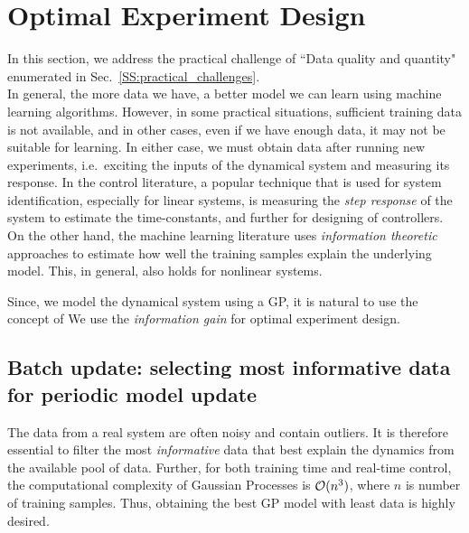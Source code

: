 \section{Optimal Experiment Design}
\label{S:oed}

In this section, we address the practical challenge of ``Data quality and quantity" enumerated in Sec.~\ref{SS:practical_challenges}.
\\

In general, the more data we have, a better model we can learn using machine learning algorithms. However, in some practical situations, sufficient training data is not available, and in other cases, even if we have enough data, it may not be suitable for learning. In either case, we must obtain data after running new experiments, i.e.~exciting the inputs of the dynamical system and measuring its response. In the control literature, a popular technique that is used for system identification, especially for linear systems, is measuring the \textit{step response} of the system to estimate the time-constants, and further for designing of controllers. On the other hand, the machine learning literature uses \textit{information theoretic} approaches to estimate how well the training samples explain the underlying model. This, in general, also holds for nonlinear systems.

Since, we model the dynamical system using a GP, it is natural to use the concept of We use the \textit{information gain} for optimal experiment design.


\subsection{Batch update: selecting most informative data for periodic model update}

The data from a real system are often noisy and contain outliers. 
It is therefore essential to filter the most \textit{informative} data that best explain the dynamics from the available pool of data.
Further, for both training time and real-time control, the computational complexity of Gaussian Processes is $\mathcal{O}(n^3)$, where $n$ is number of training samples. Thus, obtaining the best GP model with least data is highly desired.

